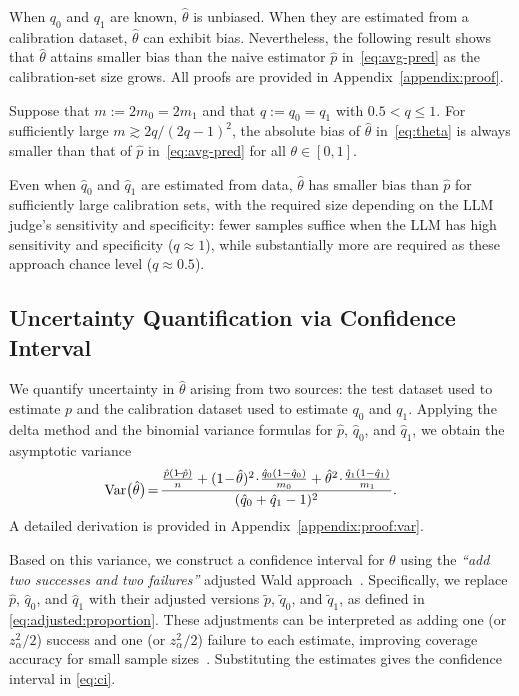 When $q_0$ and $q_1$ are known, $\hat{\theta}$ is unbiased. When they are estimated from a calibration dataset, $\hat{\theta}$ can exhibit bias. Nevertheless, the following result shows that $\hat{\theta}$ attains smaller bias than the naive estimator $\hat{p}$ in~\eqref{eq:avg-pred} as the calibration-set size grows. All proofs are provided in Appendix~\ref{appendix:proof}.
\begin{proposition}
    \label{thm:bias}
    Suppose that $m := 2m_0 = 2m_1$ and that $q := q_0 = q_1$ with $0.5 < q \leq 1$. For sufficiently large $m\gtrsim 2q/(2q-1)^2$, the absolute bias of $\hat{\theta}$ in~\eqref{eq:theta} is always smaller than that of $\hat{p}$ in~\eqref{eq:avg-pred} for all $\theta \in [0,1]$.
\end{proposition}
Even when $\hat{q}_0$ and $\hat{q}_1$ are estimated from data, $\hat{\theta}$ has smaller bias than $\hat{p}$ for sufficiently large calibration sets, with the required size depending on the LLM judge’s sensitivity and specificity: fewer samples suffice when the LLM has high sensitivity and specificity ($q \approx 1$), while substantially more are required as these approach chance level ($q \approx 0.5$).


\subsection{Uncertainty Quantification via Confidence Interval}

We quantify uncertainty in $\hat{\theta}$ arising from two sources: the test dataset used to estimate $p$ and the calibration dataset used to estimate $q_0$ and $q_1$.
Applying the delta method and the binomial variance formulas for $\hat{p}$, $\hat{q}_0$, and $\hat{q}_1$, we obtain the asymptotic variance
\begin{align}
    \label{eq:var}
    \Var \big(\hat{\theta}\big)
    \!=\!
    \frac{
    \frac{\hat{p}(1 \!\!-\! \hat{p})}{n}
    + (1 \!-\! \hat{\theta})^2 \!\cdot\! \frac{\hat{q}_0(1 - \hat{q}_0)}{m_0}
    + \hat{\theta}^2 \!\cdot\! \frac{\hat{q}_1(1 - \hat{q}_1)}{m_1}
    }{
    (\hat{q}_0 + \hat{q}_1 - 1)^2
    } .
    \;\;\;\;\;
\end{align}
A detailed derivation is provided in Appendix~\ref{appendix:proof:var}.

Based on this variance, we construct a confidence interval for $\theta$ using the \emph{``add two successes and two failures''} adjusted Wald approach~\citep{de1820theorie, agresti1998approximate, brown2001interval, lang2014confidence}.
Specifically, we replace $\hat{p}$, $\hat{q}_0$, and $\hat{q}_1$ with their adjusted versions $\tilde{p}$, $\tilde{q}_0$, and $\tilde{q}_1$, as defined in \eqref{eq:adjusted:proportion}.
These adjustments can be interpreted as adding one (or $z_\alpha^2/2$) success and one (or $z_\alpha^2/2$) failure to each estimate, improving coverage accuracy for small sample sizes~\citep{agresti2000simple}.
Substituting the estimates gives the confidence interval in \eqref{eq:ci}.

